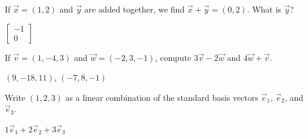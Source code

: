 \begin{exercise}
If $\vec{x} = (1,2)$ and $\vec{y}$ are added together, we find
$\vec{x}+\vec{y} = (0,2)$.  What is $\vec{y}$?
\end{exercise}
\comboSol{%
}
{%
$\begin{bmatrix}  -1 \\ 0  \end{bmatrix}$
}

\begin{exercise}
If $\vec{v} = (1, -4, 3)$ and $\vec{w} = (-2, 3, -1)$, compute $3\vec{v} - 2\vec{w}$ and $4\vec{w} + \vec{v}$. 
\end{exercise}
\comboSol{%
}
{%
$(9, -18, 11)$, $(-7, 8, -1)$
}

\begin{exercise}
Write $(1,2,3)$ as a linear combination of the standard basis vectors
$\vec{e}_1$, $\vec{e}_2$, and $\vec{e}_3$.
\end{exercise}
\comboSol{%
}
{%
$1\vec{e}_1 + 2\vec{e}_2 + 3\vec{e}_3$
}


